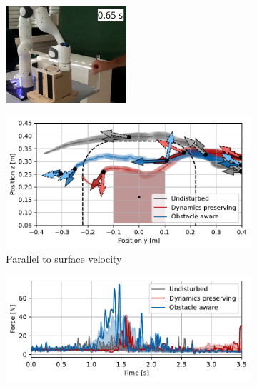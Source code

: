 \begin{figure}
\begin{subfigure}{\columnwidth}
    \includegraphics[width=0.49\textwidth]{figures/franka_sequence/franka_velocity_conserving025}\hfill%
      \caption{}
      \label{fig:franka_sequence_obstacle_aware}
    \end{subfigure}
    \begin{subfigure}{\columnwidth}
      \centerline{\includegraphics[width=\textwidth]{figures/robot_arm_trajectory_xyz}}
      \caption{Parallel to surface velocity}
      \label{fig:robot_arm_trajectory_xyz}
    \end{subfigure}
    \begin{subfigure}{\columnwidth}
    \includegraphics[width=\textwidth]{figures/trajectory_comparison_force_magnitude}

\end{subfigure}
\end{figure}
